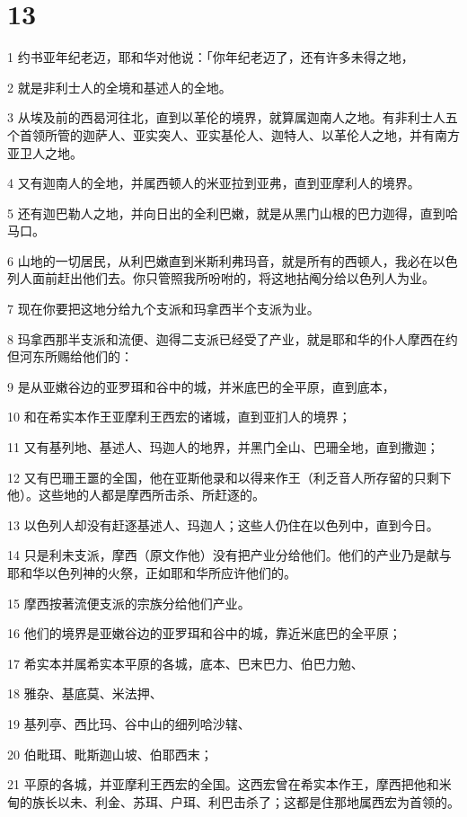 \chapter{13}

\par 1 约书亚年纪老迈，耶和华对他说：「你年纪老迈了，还有许多未得之地，
\par 2 就是非利士人的全境和基述人的全地。
\par 3 从埃及前的西曷河往北，直到以革伦的境界，就算属迦南人之地。有非利士人五个首领所管的迦萨人、亚实突人、亚实基伦人、迦特人、以革伦人之地，并有南方亚卫人之地。
\par 4 又有迦南人的全地，并属西顿人的米亚拉到亚弗，直到亚摩利人的境界。
\par 5 还有迦巴勒人之地，并向日出的全利巴嫩，就是从黑门山根的巴力迦得，直到哈马口。
\par 6 山地的一切居民，从利巴嫩直到米斯利弗玛音，就是所有的西顿人，我必在以色列人面前赶出他们去。你只管照我所吩咐的，将这地拈阄分给以色列人为业。
\par 7 现在你要把这地分给九个支派和玛拿西半个支派为业。
\par 8 玛拿西那半支派和流便、迦得二支派已经受了产业，就是耶和华的仆人摩西在约但河东所赐给他们的：
\par 9 是从亚嫩谷边的亚罗珥和谷中的城，并米底巴的全平原，直到底本，
\par 10 和在希实本作王亚摩利王西宏的诸城，直到亚扪人的境界；
\par 11 又有基列地、基述人、玛迦人的地界，并黑门全山、巴珊全地，直到撒迦；
\par 12 又有巴珊王噩的全国，他在亚斯他录和以得来作王（利乏音人所存留的只剩下他）。这些地的人都是摩西所击杀、所赶逐的。
\par 13 以色列人却没有赶逐基述人、玛迦人；这些人仍住在以色列中，直到今日。
\par 14 只是利未支派，摩西（原文作他）没有把产业分给他们。他们的产业乃是献与耶和华以色列神的火祭，正如耶和华所应许他们的。
\par 15 摩西按著流便支派的宗族分给他们产业。
\par 16 他们的境界是亚嫩谷边的亚罗珥和谷中的城，靠近米底巴的全平原；
\par 17 希实本并属希实本平原的各城，底本、巴末巴力、伯巴力勉、
\par 18 雅杂、基底莫、米法押、
\par 19 基列亭、西比玛、谷中山的细列哈沙辖、
\par 20 伯毗珥、毗斯迦山坡、伯耶西末；
\par 21 平原的各城，并亚摩利王西宏的全国。这西宏曾在希实本作王，摩西把他和米甸的族长以未、利金、苏珥、户珥、利巴击杀了；这都是住那地属西宏为首领的。
